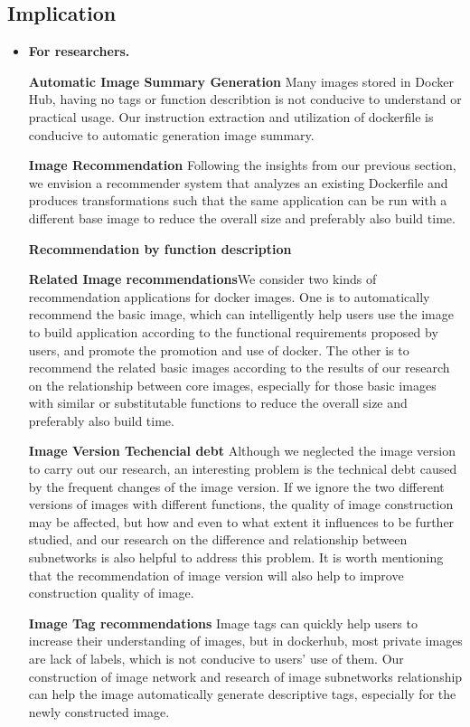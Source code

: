 \documentclass[sigconf]{acmart}
\begin{document}
\subsection{Implication}
\begin{itemize}
\item \textbf{For researchers.}

\noindent\textbf{Automatic Image Summary Generation} Many images stored in Docker Hub, having no tags or function describtion is not conducive to understand or practical usage. 
Our instruction extraction and utilization of dockerfile is conducive to automatic generation image summary.



\noindent\textbf{Image Recommendation} Following the insights from our previous section, we envision a recommender system that analyzes an existing Dockerfile and produces transformations such that the same application can be run with a different base image to reduce the overall size and preferably also build time. 

\noindent\textbf{Recommendation by function description}

\noindent\textbf{Related Image recommendations}We consider two kinds of recommendation applications for docker images. One is to automatically recommend the basic image, which can intelligently help users use the image to build application according to the functional requirements proposed by users, and promote the promotion and use of docker. The other is to recommend the related basic images according to the results of our research on the relationship between core images, especially for those basic images with similar or substitutable functions to reduce the overall size and preferably also build time.


\noindent\textbf{Image Version Techencial debt} Although we neglected the image version to carry out our research, an interesting problem is the technical debt caused by the frequent changes of the image version. If we ignore the two different versions of images with different functions, the quality of image construction may be affected, but how and even to what extent it influences to be further studied, and our research on the difference and relationship between subnetworks is also helpful to address this problem. It is worth mentioning that the recommendation of image version will also help to improve construction quality of image. 




\noindent\textbf{Image Tag recommendations} Image tags can quickly help users to increase their understanding of images, but in dockerhub, most private images are lack of labels, which is not conducive to users' use of them. Our construction of image network and  research of image subnetworks relationship can help the image automatically generate descriptive tags, especially for the newly constructed image. 




\end{itemize}
\end{document}
